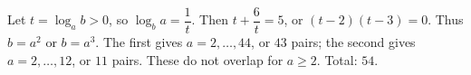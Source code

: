 Let $t=\log_a b>0$, so $\log_b a=\dfrac{1}{t}$. Then $t+\dfrac{6}{t}=5$, or $(t-2)(t-3)=0$. Thus $b=a^2$ or $b=a^3$. The first gives $a=2,\ldots,44$, or $43$ pairs; the second gives $a=2,\ldots,12$, or $11$ pairs. These do not overlap for $a\ge2$. Total: $\boxed{54}$.
